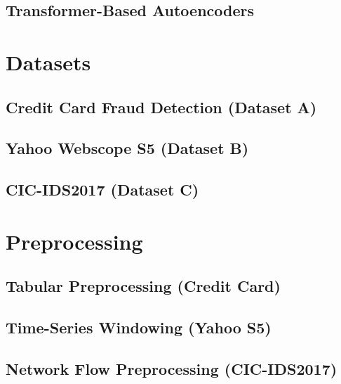 \subsection{Transformer-Based Autoencoders}

\section{Datasets}

\subsection{Credit Card Fraud Detection (Dataset A)}
\subsection{Yahoo Webscope S5 (Dataset B)}
\subsection{CIC-IDS2017 (Dataset C)}

\section{Preprocessing}
\label{sec:preprocessing}

\subsection{Tabular Preprocessing (Credit Card)}
\subsection{Time-Series Windowing (Yahoo S5)}
\subsection{Network Flow Preprocessing (CIC-IDS2017)}

